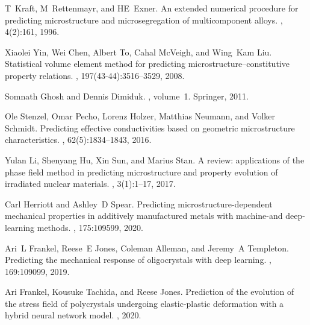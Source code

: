 \documentclass[12pt,reqno]{article}
\begin{document}
\begin{thebibliography}{10}

T~Kraft, M~Rettenmayr, and HE~Exner.
\newblock An extended numerical procedure for predicting microstructure and
microsegregation of multicomponent alloys.
,
4(2):161, 1996.

Xiaolei Yin, Wei Chen, Albert To, Cahal McVeigh, and Wing~Kam Liu.
\newblock Statistical volume element method for predicting
microstructure--constitutive property relations.
,
197(43-44):3516--3529, 2008.

Somnath Ghosh and Dennis Dimiduk.
, volume~1.
\newblock Springer, 2011.

Ole Stenzel, Omar Pecho, Lorenz Holzer, Matthias Neumann, and Volker Schmidt.
\newblock Predicting effective conductivities based on geometric microstructure
characteristics.
, 62(5):1834--1843, 2016.

Yulan Li, Shenyang Hu, Xin Sun, and Marius Stan.
\newblock A review: applications of the phase field method in predicting
microstructure and property evolution of irradiated nuclear materials.
, 3(1):1--17, 2017.

Carl Herriott and Ashley~D Spear.
\newblock Predicting microstructure-dependent mechanical properties in
additively manufactured metals with machine-and deep-learning methods.
, 175:109599, 2020.

Ari~L Frankel, Reese~E Jones, Coleman Alleman, and Jeremy~A Templeton.
\newblock Predicting the mechanical response of oligocrystals with deep
learning.
, 169:109099, 2019.

Ari Frankel, Kousuke Tachida, and Reese Jones.
\newblock Prediction of the evolution of the stress field of polycrystals
undergoing elastic-plastic deformation with a hybrid neural network model.
, 2020.


\end{thebibliography}
\end{document}
